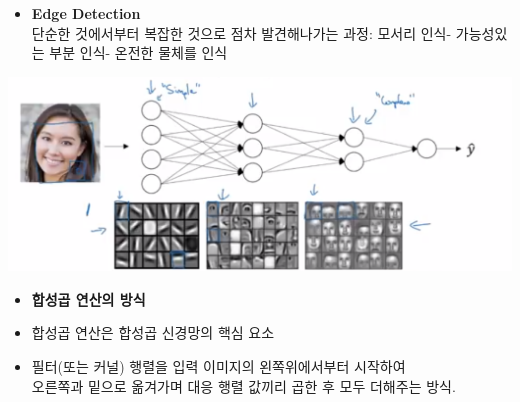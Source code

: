 \documentclass[11pt]{article}
\makeatletter
\def\maxwidth{\ifdim\Gin@nat@width>\linewidth\linewidth
    \else\Gin@nat@width\fi}
\let\Oldincludegraphics\includegraphics
\renewcommand{\includegraphics}[1]{\Oldincludegraphics[width=.8\maxwidth]{#1}}
\providecommand{\tightlist}{%
      \setlength{\itemsep}{0pt}\setlength{\parskip}{0pt}}
\makeatother
\begin{document}
\begin{itemize}
\tightlist
\item
  \textbf{Edge Detection}\\
  단순한 것에서부터 복잡한 것으로 점차 발견해나가는 과정: 모서리 인식-
  가능성있는 부분 인식- 온전한 물체를 인식
\end{itemize}

\includegraphics{./Images/c4week1/14-2.png}

\begin{itemize}
\tightlist
\item
  \textbf{합성곱 연산의 방식}\\
\item
  합성곱 연산은 합성곱 신경망의 핵심 요소
\item
  필터(또는 커널) 행렬을 입력 이미지의 왼쪽위에서부터 시작하여\\
  오른쪽과 밑으로 옮겨가며 대응 행렬 값끼리 곱한 후 모두 더해주는 방식.
\end{itemize}
\end{document}
